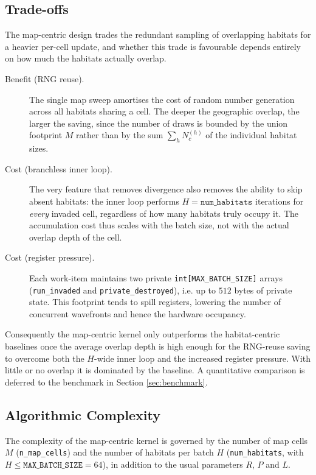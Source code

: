 \subsection{Trade-offs}\label{subsec:map_centric_tradeoffs}
The map-centric design trades the redundant sampling of overlapping habitats for a heavier per-cell update, and whether this trade is favourable depends entirely on how much the habitats actually overlap.
\begin{description}
    \item[Benefit (RNG reuse).] The single map sweep amortises the cost of random number generation across all habitats sharing a cell. The deeper the geographic overlap, the larger the saving, since the number of draws is bounded by the union footprint $M$ rather than by the sum $\sum_h N_c^{(h)}$ of the individual habitat sizes.
    \item[Cost (branchless inner loop).] The very feature that removes divergence also removes the ability to skip absent habitats: the inner loop performs $H = \texttt{num\_habitats}$ iterations for \emph{every} invaded cell, regardless of how many habitats truly occupy it. The accumulation cost thus scales with the batch size, not with the actual overlap depth of the cell.
    \item[Cost (register pressure).] Each work-item maintains two private \texttt{int[MAX\_BATCH\_SIZE]} arrays (\texttt{run\_invaded} and \texttt{private\_destroyed}), i.e. up to $512$ bytes of private state. This footprint tends to spill registers, lowering the number of concurrent wavefronts and hence the hardware occupancy.
\end{description}
\noindent
Consequently the map-centric kernel only outperforms the habitat-centric baselines once the average overlap depth is high enough for the RNG-reuse saving to overcome both the $H$-wide inner loop and the increased register pressure. With little or no overlap it is dominated by the baseline. A quantitative comparison is deferred to the benchmark in Section \ref{sec:benchmark}.

\subsection{Algorithmic Complexity}\label{subsec:map_centric_complexity}
The complexity of the map-centric kernel is governed by the number of map cells $M$ (\texttt{n\_map\_cells}) and the number of habitats per batch $H$ (\texttt{num\_habitats}, with $H \leq \texttt{MAX\_BATCH\_SIZE} = 64$), in addition to the usual parameters $R$, $P$ and $L$.

